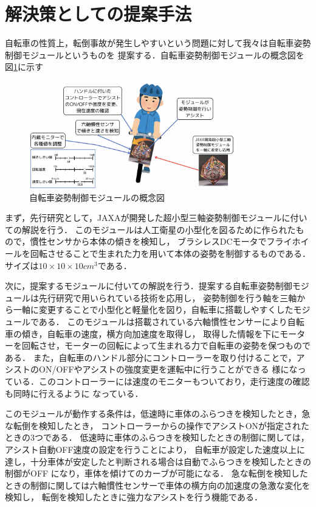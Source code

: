 \documentclass[uplatex,dvipdfmx]{jsarticle}
\begin{document}
\section{解決策としての提案手法}

自転車の性質上，転倒事故が発生しやすいという問題に対して我々は自転車姿勢制御モジュールというものを
提案する．自転車姿勢制御モジュールの概念図を図\ref{fig:moduleGainenn}に示す

\begin{figure}[H]
    \centering
    \includegraphics[width=0.8\textwidth]{fig/moduleGainenn2.png}
    \caption{自転車姿勢制御モジュールの概念図}
    \label{fig:moduleGainenn}
\end{figure}

まず，先行研究として，JAXAが開発した超小型三軸姿勢制御モジュールに付いての解説を行う．\cite{jaxaModule}
このモジュールは人工衛星の小型化を図るために作られたもので，慣性センサから本体の傾きを検知し，
ブラシレスDCモータでフライホイールを回転させることで生まれた力を用いて本体の姿勢を制御するものである．
サイズは$10×10×10 {cm}^3$である．

次に，提案するモジュールに付いての解説を行う．提案する自転車姿勢制御モジュールは先行研究で用いられている技術を応用し，
姿勢制御を行う軸を三軸から一軸に変更することで小型化と軽量化を図り，自転車に搭載しやすくしたモジュールである．
このモジュールは搭載されている六軸慣性センサーにより自転車の傾き，自転車の速度，横方向加速度を取得し，
取得した情報を下にモーターを回転させ，モーターの回転によって生まれる力で自転車の姿勢を保つものである．
また，自転車のハンドル部分にコントローラーを取り付けることで，アシストのON/OFFやアシストの強度変更を運転中に行うことができる
様になっている．このコントローラーには速度のモニターもついており，走行速度の確認も同時に行えるように
なっている．

このモジュールが動作する条件は，低速時に車体のふらつきを検知したとき，急な転倒を検知したとき，
コントローラーからの操作でアシストONが指定されたときの3つである．
低速時に車体のふらつきを検知したときの制御に関しては，アシスト自動OFF速度の設定を行うことにより，
自転車が設定した速度以上に達し，十分車体が安定したと判断される場合は自動でふらつきを検知したときの制御がOFF
になり，車体を傾けてのカーブが可能になる．
急な転倒を検知したときの制御に関しては六軸慣性センサーで車体の横方向の加速度の急激な変化を検知し，
転倒を検知したときに強力なアシストを行う機能である．
\end{document}
